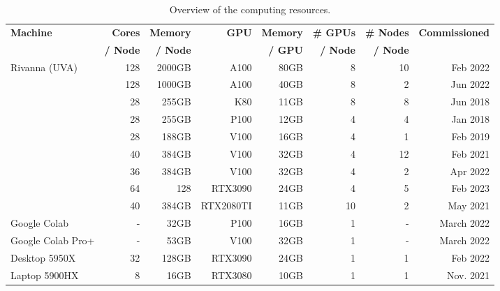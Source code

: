 \documentclass[utf8]{FrontiersinVancouver} %
\begin{document}
\begin{table}
    \caption{Overview of the computing resources.}
    \label{tab:hwoverview}
    \begin{center}
    {\footnotesize
    \begin{tabular}{|l|r|r|r|r|r|r|r|}
        \hline
            {\bf Machine}  & {\bf Cores} & {\bf Memory} & {\bf GPU}   &   {\bf Memory} & {\bf \# GPUs} & {\bf \# Nodes}  & {\bf Commissioned} \\ 
                     &  {\bf / Node} & {\bf / Node}  &  & {\bf / GPU} & {\bf / Node}     &   {\bf / Node}        &  \\
        \hline
        \hline
        Rivanna (UVA)    & 128 & 2000GB   & A100 & 80GB &  8  & 10 & Feb 2022 \\
                        & 128 & 1000GB   & A100 & 40GB &  8  &  2 & Jun 2022  \\   
                        & 28  & 255GB    & K80  & 11GB &  8  &  8 & Jun 2018         \\
                        & 28  & 255GB    & P100 & 12GB &  4  &  4 & Jan 2018         \\
                        & 28  & 188GB    & V100 & 16GB &  4  &  1 & Feb 2019          \\
                        & 40  & 384GB    & V100 & 32GB &  4  & 12 & Feb 2021          \\
                        & 36  & 384GB    & V100 & 32GB &  4  &  2 & Apr 2022          \\
                        &  64 & 128     & RTX3090   & 24GB    & 4   &  5 & Feb 2023         \\
                        & 40  & 384GB    & RTX2080TI & 11GB & 10  &  2 & May 2021 \\                        
         \hline
         Google Colab      & -   & 32GB      & P100      & 16GB    & 1 & - & March 2022 \\
         Google Colab Pro+ & -   & 53GB      & V100      & 32GB    & 1 & - & March 2022 \\
         \hline
         Desktop 5950X     &  32 & 128GB     & RTX3090   & 24GB    & 1 & 1 & Feb 2022   \\
         \hline
         Laptop 5900HX     &   8 & 16GB      & RTX3080   & 10GB    & 1 & 1 & Nov. 2021 \\
         \hline
    \end{tabular}
    }
    \end{center}


\end{table}
\end{document}
